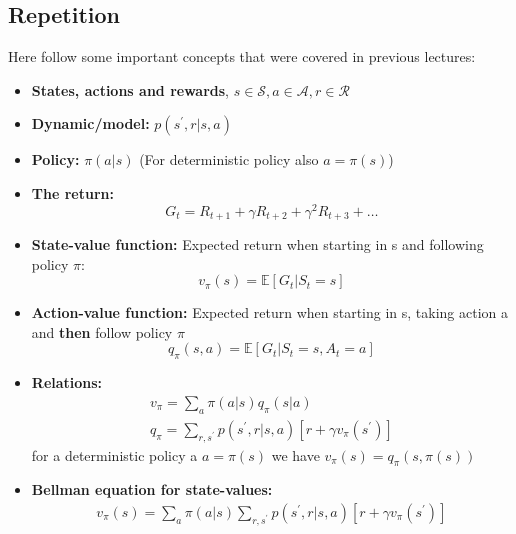 
\subsection{Repetition}
Here follow some important concepts that were covered in previous lectures:

\begin{wbox}{}
\begin{itemize}
	\item \textbf{States, actions and rewards}, $s \in \mathcal{S}, a \in \mathcal{A}, r \in \mathcal{R}$
	\item \textbf{Dynamic/model:} $p(s^{\prime},r|s,a)$
	\item \textbf{Policy:} $\pi(a|s)$ (For deterministic policy also $a = \pi(s)$)
	\item \textbf{The return:} 
		\begin{equation}
			G_t = R_{t+1}+\gamma R_{t+2} + \gamma^{2}R_{t+3} + \ldots
		\end{equation}
	\item \textbf{State-value function:} Expected return when starting in s and following policy $\pi$: 
		\begin{equation}
			v_\pi(s) = \mathbb{E}[G_t | S_t =s]
		\end{equation}
	\item \textbf{Action-value function:} Expected return when starting in s, taking action a and \textbf{then} follow policy $\pi$ 
		\begin{equation}
			q_\pi(s,a) = \mathbb{E}[G_t | S_t = s, A_t = a]
		\end{equation}
	\item \textbf{Relations:} 
		\begin{equation}
		\begin{aligned}
			v_\pi = \sum_{a}^{} \pi(a|s) q_\pi(s|a) \\
			q_\pi = \sum_{r, s^{\prime}}^{} p(s^{\prime},r|s,a)[r + \gamma v_\pi(s^{\prime})] 
		\end{aligned}
		\end{equation}
		for a deterministic policy a $a = \pi(s)$ we have $v_\pi(s) = q_\pi(s, \pi(s))$
	\item \textbf{Bellman equation for state-values:}
		\begin{equation}
		\begin{aligned}
			v_\pi(s) = \sum_{a}^{} \pi (a|s) \sum_{r, s^{\prime}}^{} p(s^{\prime},r|s,a)[r + \gamma v_\pi(s^{\prime})] \\

\end{aligned}
\end{equation}
\end{itemize}
\end{wbox}
